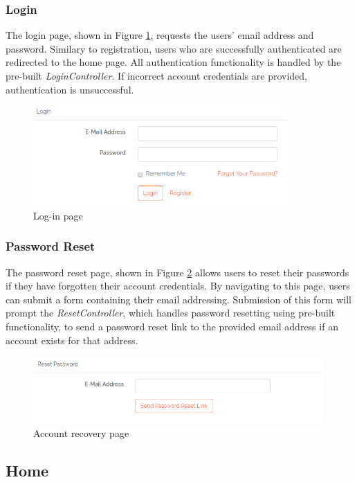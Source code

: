 \subsubsection{Login}
The login page, shown in Figure \ref{fig:LoginPage}, requests the users' email address and password. Similary to registration, users who are successfully authenticated are redirected to the home page. All authentication functionality is handled by the pre-built \textit{LoginController}. If incorrect account credentials are provided, authentication is unsuccessful.

\begin{figure}[H]
\centering
\includegraphics[height=1.5in]{Images/Design/login-page}
\caption{Log-in page}
\label{fig:LoginPage}
\end{figure}

\subsubsection{Password Reset}
The password reset page, shown in Figure \ref{fig:PasswordReset} allows users to reset their passwords if they have forgotten their account credentials. By navigating to this page, users can submit a form containing their email addressing. Submission of this form will prompt the \textit{ResetController}, which handles password resetting using pre-built functionality, to send a password reset link to the provided email address if an account exists for that address.

\begin{figure}[H]
\centering
\includegraphics[height=1in]{Images/Implementation/PasswordReset}
\caption{Account recovery page}
\label{fig:PasswordReset}
\end{figure}

\subsection{Home}
